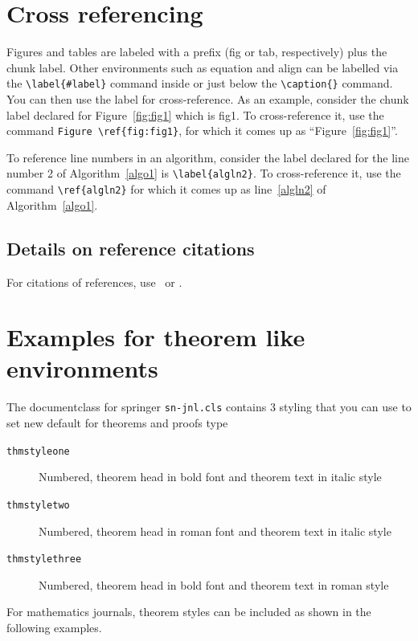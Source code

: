 \documentclass[sn-basic,lineno,pdflatex]{sn-jnl}
\theoremstyle{remark}
\theoremstyle{definition}
\begin{document}
\section{Cross referencing}\label{sec8}

Figures and tables are labeled with a prefix (fig or tab, respectively)
plus the chunk label. Other environments such as equation and align can
be labelled via the \texttt{\textbackslash{}label\{\#label\}} command
inside or just below the \texttt{\textbackslash{}caption\{\}} command.
You can then use the label for cross-reference. As an example, consider
the chunk label declared for Figure~\ref{fig:fig1} which is fig1. To
cross-reference it, use the command
\texttt{Figure\ \textbackslash{}ref\{fig:fig1\}}, for which it comes up
as ``Figure~\ref{fig:fig1}''.

To reference line numbers in an algorithm, consider the label declared
for the line number 2 of Algorithm~\ref{algo1} is
\texttt{\textbackslash{}label\{algln2\}}. To cross-reference it, use the
command \texttt{\textbackslash{}ref\{algln2\}} for which it comes up as
line~\ref{algln2} of Algorithm~\ref{algo1}.

\subsection{Details on reference citations}\label{subsec7}

For citations of references, use~\citet{bib1} or \citep{bib2}.

\section{Examples for theorem like environments}\label{sec10}

The documentclass for springer \texttt{sn-jnl.cls} contains 3 styling
that you can use to set new default for theorems and proofs type

\begin{description}
\item[\texttt{thmstyleone}]
Numbered, theorem head in bold font and theorem text in italic style
\item[\texttt{thmstyletwo}]
Numbered, theorem head in roman font and theorem text in italic style
\item[\texttt{thmstylethree}]
Numbered, theorem head in bold font and theorem text in roman style
\end{description}

For mathematics journals, theorem styles can be included as shown in the
following examples.
\end{document}
